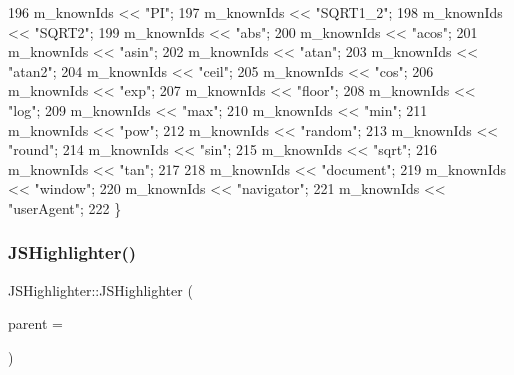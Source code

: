\begin{DoxyCode}
196     m\_knownIds << \textcolor{stringliteral}{"PI"};
197     m\_knownIds << \textcolor{stringliteral}{"SQRT1\_2"};
198     m\_knownIds << \textcolor{stringliteral}{"SQRT2"};
199     m\_knownIds << \textcolor{stringliteral}{"abs"};
200     m\_knownIds << \textcolor{stringliteral}{"acos"};
201     m\_knownIds << \textcolor{stringliteral}{"asin"};
202     m\_knownIds << \textcolor{stringliteral}{"atan"};
203     m\_knownIds << \textcolor{stringliteral}{"atan2"};
204     m\_knownIds << \textcolor{stringliteral}{"ceil"};
205     m\_knownIds << \textcolor{stringliteral}{"cos"};
206     m\_knownIds << \textcolor{stringliteral}{"exp"};
207     m\_knownIds << \textcolor{stringliteral}{"floor"};
208     m\_knownIds << \textcolor{stringliteral}{"log"};
209     m\_knownIds << \textcolor{stringliteral}{"max"};
210     m\_knownIds << \textcolor{stringliteral}{"min"};
211     m\_knownIds << \textcolor{stringliteral}{"pow"};
212     m\_knownIds << \textcolor{stringliteral}{"random"};
213     m\_knownIds << \textcolor{stringliteral}{"round"};
214     m\_knownIds << \textcolor{stringliteral}{"sin"};
215     m\_knownIds << \textcolor{stringliteral}{"sqrt"};
216     m\_knownIds << \textcolor{stringliteral}{"tan"};
217 
218     m\_knownIds << \textcolor{stringliteral}{"document"};
219     m\_knownIds << \textcolor{stringliteral}{"window"};
220     m\_knownIds << \textcolor{stringliteral}{"navigator"};
221     m\_knownIds << \textcolor{stringliteral}{"userAgent"};
222 \}
\end{DoxyCode}
\mbox{\label{class_j_s_highlighter_a0b110ce0492f6ac3c2310de65fcd7919}} 
\subsubsection{\texorpdfstring{J\+S\+Highlighter()}{JSHighlighter()}\hspace{0.1cm}{\footnotesize\ttfamily [2/2]}}
{\footnotesize\ttfamily J\+S\+Highlighter\+::\+J\+S\+Highlighter (\begin{DoxyParamCaption}\item[{Q\+Text\+Document $\ast$}]{parent = {} }\end{DoxyParamCaption})\hspace{0.3cm}{\ttfamily [inline]}}



